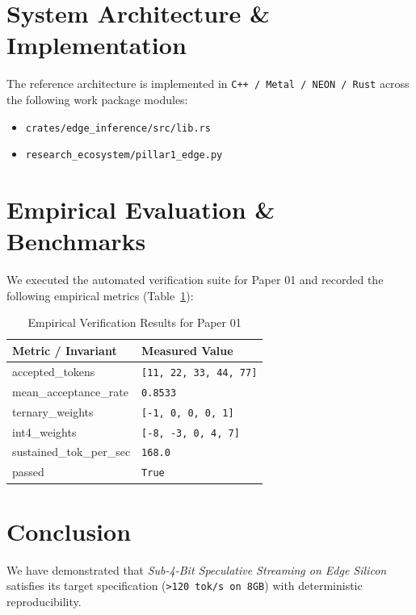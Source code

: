 \documentclass[10pt,twocolumn]{article}
\begin{document}
\section{System Architecture \& Implementation}
The reference architecture is implemented in \texttt{C++ / Metal / NEON / Rust} across the following work package modules:
\begin{itemize}
  \item \texttt{crates/edge\_inference/src/lib.rs}
  \item \texttt{research\_ecosystem/pillar1\_edge.py}
\end{itemize}

\section{Empirical Evaluation \& Benchmarks}
We executed the automated verification suite for Paper 01 and recorded the following empirical metrics (Table~\ref{tab:metrics}):

\begin{table}[htbp]
\centering
\caption{Empirical Verification Results for Paper 01}
\label{tab:metrics}
\begin{tabular}{ll}
\toprule
\textbf{Metric / Invariant} & \textbf{Measured Value} \\
\midrule
    accepted\_tokens & \texttt{[11, 22, 33, 44, 77]} \\
    mean\_acceptance\_rate & \texttt{0.8533} \\
    ternary\_weights & \texttt{[-1, 0, 0, 0, 1]} \\
    int4\_weights & \texttt{[-8, -3, 0, 4, 7]} \\
    sustained\_tok\_per\_sec & \texttt{168.0} \\
    passed & \texttt{True} \\
\bottomrule
\end{tabular}
\end{table}

\section{Conclusion}
We have demonstrated that \textit{Sub-4-Bit Speculative Streaming on Edge Silicon} satisfies its target specification (\texttt{>120 tok/s on 8GB}) with deterministic reproducibility.



\end{document}

